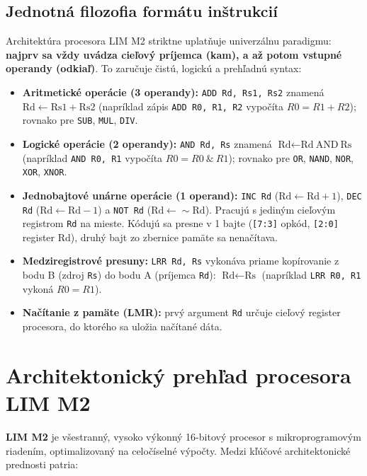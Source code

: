 \documentclass[11pt,a4paper]{article}
\newcommand{\reg}[1]{\texttt{#1}}
\begin{document}
\subsection{Jednotná filozofia formátu inštrukcií}
Architektúra procesora LIM M2 striktne uplatňuje univerzálnu paradigmu: \textbf{najprv sa vždy uvádza cieľový príjemca (kam), a až potom vstupné operandy (odkiaľ)}. To zaručuje čistú, logickú a prehľadnú syntax:
\begin{itemize}
  \item \textbf{Aritmetické operácie (3 operandy):} \texttt{ADD Rd, Rs1, Rs2} znamená $\text{Rd} \leftarrow \text{Rs1} + \text{Rs2}$ (napríklad zápis \texttt{ADD R0, R1, R2} vypočíta $R0 = R1 + R2$); rovnako pre \texttt{SUB}, \texttt{MUL}, \texttt{DIV}.
  \item \textbf{Logické operácie (2 operandy):} \texttt{AND Rd, Rs} znamená $\text{Rd} \leftarrow \text{Rd} \ \text{AND}\ \text{Rs}$ (napríklad \texttt{AND R0, R1} vypočíta $R0 = R0 \ \& \ R1$); rovnako pre \texttt{OR}, \texttt{NAND}, \texttt{NOR}, \texttt{XOR}, \texttt{XNOR}.
  \item \textbf{Jednobajtové unárne operácie (1 operand):} \texttt{INC Rd} ($\text{Rd} \leftarrow \text{Rd} + 1$), \texttt{DEC Rd} ($\text{Rd} \leftarrow \text{Rd} - 1$) a \texttt{NOT Rd} ($\text{Rd} \leftarrow \sim\text{Rd}$). Pracujú s jediným cieľovým registrom \reg{Rd} na mieste. Kódujú sa presne v 1 bajte (\texttt{[7:3]} opkód, \texttt{[2:0]} register Rd), druhý bajt zo zbernice pamäte sa nenačítava.
  \item \textbf{Medziregistrové presuny:} \texttt{LRR Rd, Rs} vykonáva priame kopírovanie z bodu B (zdroj \reg{Rs}) do bodu A (príjemca \reg{Rd}): $\text{Rd} \leftarrow \text{Rs}$ (napríklad \texttt{LRR R0, R1} vykoná $R0 = R1$).
  \item \textbf{Načítanie z pamäte (LMR):} prvý argument \reg{Rd} určuje cieľový register procesora, do ktorého sa uložia načítané dáta.
\end{itemize}

\section{Architektonický prehľad procesora LIM M2}
\textbf{LIM M2} je všestranný, vysoko výkonný 16-bitový procesor s mikroprogramovým riadením, optimalizovaný na celočíselné výpočty. Medzi kľúčové architektonické prednosti patria:
\end{document}
